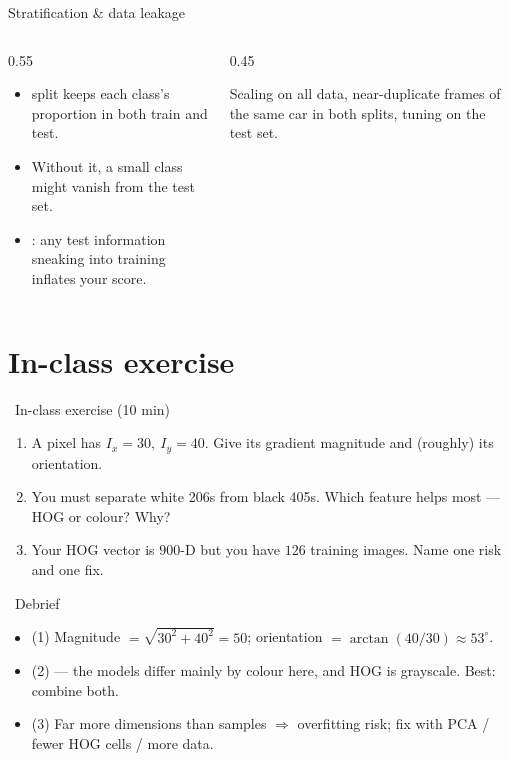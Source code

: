 \documentclass[10pt,aspectratio=169]{beamer}
\begin{document}
\begin{frame}{Stratification \& data leakage}
  \begin{columns}[T]
    \begin{column}{0.55\textwidth}
      \begin{itemize}
        \item {} split keeps each class's proportion in both train and test.
        \item Without it, a small class might vanish from the test set.
        \item {}: any test information sneaking into training inflates your score.
      \end{itemize}
    \end{column}
    \begin{column}{0.45\textwidth}
      \begin{infobox}
        Scaling on all data, near-duplicate frames of the same car in both splits, tuning on the test set.
      \end{infobox}
    \end{column}
  \end{columns}
\end{frame}

\section{In-class exercise}

\begin{frame}{\faPen~In-class exercise (10 min)}
  \begin{infobox}
  \end{infobox}
  \begin{enumerate}
    \item A pixel has $I_x=30,\ I_y=40$. Give its gradient magnitude and (roughly) its orientation.
    \item You must separate white 206s from black 405s. Which feature helps most — HOG or colour? Why?
    \item Your HOG vector is $900$-D but you have $126$ training images. Name one risk and one fix.
  \end{enumerate}
\end{frame}

\begin{frame}{\faPen~Debrief}
  \begin{itemize}
    \item (1) Magnitude $=\sqrt{30^2+40^2}=50$; orientation $=\arctan(40/30)\approx 53^\circ$.
    \item (2)  — the models differ mainly by colour here, and HOG is grayscale. Best: combine both.
    \item (3) Far more dimensions than samples $\Rightarrow$ overfitting risk; fix with PCA / fewer HOG cells / more data.
  \end{itemize}
\end{frame}
\end{document}
